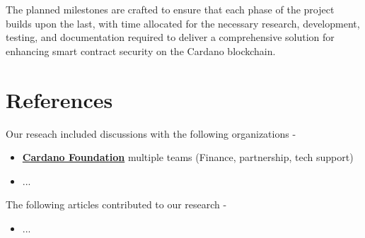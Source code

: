 \documentclass{scrreport}
\begin{document}
The planned milestones are crafted to ensure that each phase of the project builds upon the last, with time allocated for the necessary research, development, testing, and documentation required to deliver a comprehensive solution for enhancing smart contract security on the Cardano blockchain.

\appendix
\chapter{References}

Our reseach included discussions with the following organizations - 
\begin{itemize}
    \item \textbf{\href{https://cardanofoundation.org/}{Cardano Foundation}} multiple teams (Finance, partnership, tech support)
    \item ...
\end{itemize}

The following articles contributed to our research - 
\begin{itemize}
    \item ...
\end{itemize}
\end{document}
